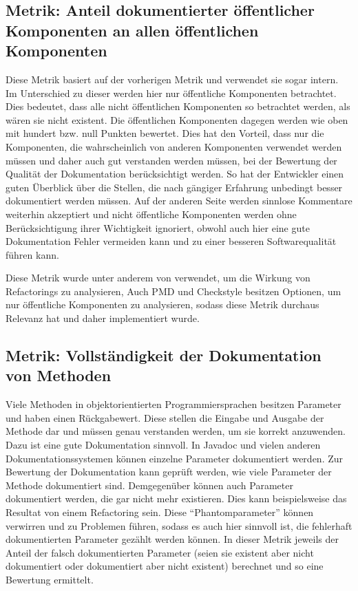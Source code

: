 \subsection{Metrik: Anteil dokumentierter öffentlicher Komponenten an allen öffentlichen Komponenten }\label{chapter:public_members}
Diese Metrik basiert auf der vorherigen Metrik und verwendet sie sogar intern. Im Unterschied zu dieser werden hier nur öffentliche Komponenten betrachtet. Dies bedeutet, dass alle nicht öffentlichen Komponenten so betrachtet werden, als wären sie nicht existent. Die öffentlichen Komponenten dagegen werden wie oben mit hundert bzw. null Punkten bewertet. Dies hat den Vorteil, dass nur die Komponenten, die wahrscheinlich von anderen Komponenten verwendet werden müssen und daher auch gut verstanden werden müssen, bei der Bewertung der Qualität der Dokumentation berücksichtigt werden. So hat der Entwickler einen guten Überblick über die Stellen, die nach gängiger Erfahrung unbedingt besser dokumentiert werden müssen. Auf der anderen Seite werden sinnlose Kommentare weiterhin akzeptiert und nicht öffentliche Komponenten werden ohne Berücksichtigung ihrer Wichtigkeit ignoriert, obwohl auch hier eine gute Dokumentation Fehler vermeiden kann und zu einer besseren Softwarequalität führen kann. 

Diese Metrik wurde unter anderem von \cite{Doautomaticrefactoringsimprovemaintainability?Anindustrialcasestudy} verwendet, um die Wirkung von Refactorings zu analysieren, Auch PMD und Checkstyle besitzen Optionen, um nur öffentliche Komponenten zu analysieren, sodass diese Metrik durchaus Relevanz hat und daher implementiert wurde.

 
 \subsection{Metrik: Vollständigkeit der Dokumentation von  Methoden}\label{chapter:method_doc}
 
Viele Methoden in objektorientierten Programmiersprachen besitzen Parameter und haben einen Rückgabewert. Diese stellen die Eingabe und Ausgabe der Methode dar und müssen genau verstanden werden, um sie korrekt anzuwenden. Dazu ist eine gute Dokumentation sinnvoll. In Javadoc und vielen anderen Dokumentationssystemen können einzelne Parameter dokumentiert werden. Zur Bewertung der Dokumentation kann geprüft werden, wie viele Parameter der Methode dokumentiert sind. Demgegenüber können auch Parameter dokumentiert werden, die gar nicht mehr existieren. Dies kann beispielsweise das Resultat von einem Refactoring sein. Diese \enquote{Phantomparameter} können verwirren und zu Problemen führen, sodass es auch hier sinnvoll ist, die fehlerhaft dokumentierten Parameter gezählt werden können. In dieser Metrik jeweils der Anteil der falsch dokumentierten Parameter (seien sie existent aber nicht dokumentiert oder dokumentiert aber nicht existent) berechnet und so eine Bewertung ermittelt.
 
